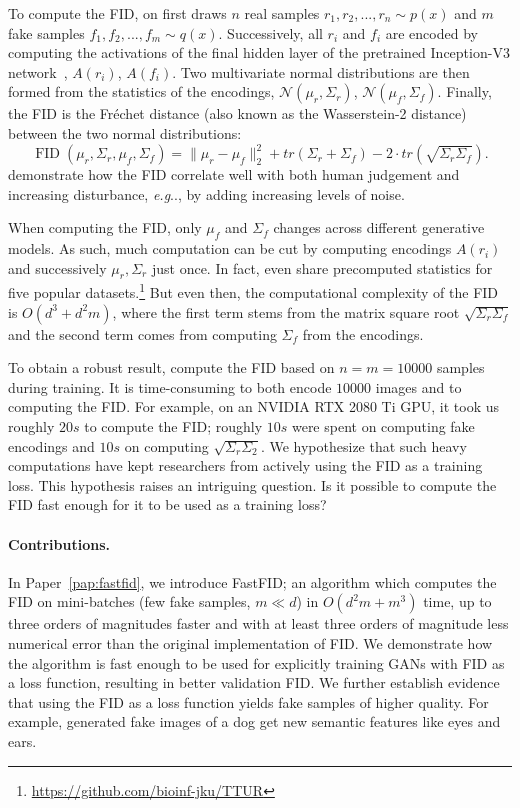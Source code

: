 \documentclass[11pt,a4paper,twoside,openright,final]{memoir}
\makeatletter
\DeclareRobustCommand\onedot{\futurelet\@let@token\@onedot}
\def\@onedot{\ifx\@let@token.\else.\null\fi\xspace}
\def\eg{\emph{e.g}\onedot} \def\Eg{\emph{E.g}\onedot}
\newcommand*{\paperref}[1]{Paper~\hyperref[#1]{\ref{#1}}}
\makeatother
\begin{document}
To compute the FID, on first draws $n$ real samples $r_1, r_2, ..., r_n \sim p(x)$ and $m$ fake samples $f_1, f_2, ..., f_m\sim q(x)$.
Successively, all $r_i$ and $f_i$ are encoded by computing the activations of the final hidden layer of the pretrained Inception-V3 network~\cite{inceptionv3}, $A(r_i)$, $A(f_i)$.
Two multivariate normal distributions are then formed from the statistics of the encodings, $\mathcal{N}(\mu_r, \Sigma_r)$, $\mathcal{N}(\mu_f, \Sigma_f)$.
Finally, the FID is the Fr\'echet distance (also known as the Wasserstein-2 distance) between the two normal distributions:
\begin{equation}\label{eq:fid}
    \operatorname{FID}(\mu_r, \Sigma_r, \mu_f, \Sigma_f) = \| \mu_r - \mu_f \|_2^2 + tr(\Sigma_r + \Sigma_f) - 2\cdot tr(\sqrt{\Sigma_r \Sigma_f}).
\end{equation}
\citet{fid} demonstrate how the FID correlate well with both human judgement and increasing disturbance, \eg, by adding increasing levels of noise. 

When computing the FID, only $\mu_f$ and $\Sigma_f$ changes across different generative models.
As such, much computation can be cut by computing encodings $A(r_i)$ and successively $\mu_r, \Sigma_r$ just once.
In fact, \citet{fid} even share precomputed statistics for five popular datasets.\footnote{\url{https://github.com/bioinf-jku/TTUR}}
But even then, the computational complexity of the FID is $O(d^3 + d^2m)$, where the first term stems from the matrix square root $\sqrt{\Sigma_r\Sigma_f}$ and the second term comes from computing $\Sigma_f$ from the encodings.

To obtain a robust result, \citet{fid} compute the FID based on $n=m=10 000$ samples during training.
It is time-consuming to both encode $10 000$ images and to computing the FID.
For example, on an NVIDIA RTX 2080 Ti GPU, it took us roughly $20s$ to compute the FID; roughly $10s$ were spent on computing fake encodings and $10s$ on computing $\sqrt{\Sigma_r\Sigma_2}$.
We hypothesize that such heavy computations have kept researchers from actively using the FID as a training loss. 
This hypothesis raises an intriguing question. 
Is it possible to compute the FID fast enough for it to be used as a training loss?

\paragraph{Contributions.} 
In \paperref{pap:fastfid}, we introduce FastFID; an algorithm which computes the FID on mini-batches (few fake samples, $m \ll d$) in $O(d^2m + m^3)$ time, up to three orders of magnitudes faster and with at least three orders of magnitude less numerical error than the original implementation of FID.
We demonstrate how the algorithm is fast enough to be used for explicitly training GANs with FID as a loss function, resulting in better validation FID. 
We further establish evidence that using the FID as a loss function yields fake samples of higher quality. 
For example, generated fake images of a dog get new semantic features like eyes and ears. 
\end{document}
